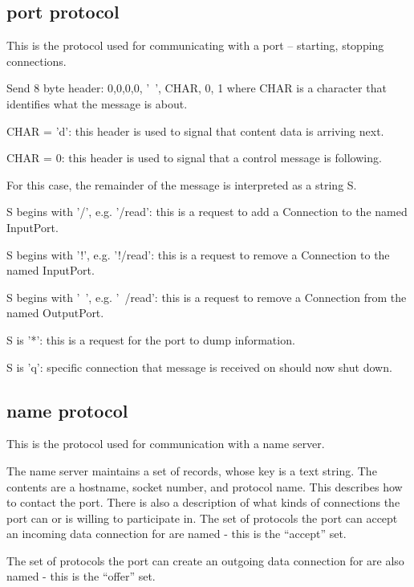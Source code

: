 \documentclass[a4]{article}
\begin{document}
\subsection{port protocol}

This is the protocol used for communicating with a port -- 
starting, stopping connections.

\begin{code}
Send 8 byte header: 0,0,0,0, '~', CHAR, 0, 1
where CHAR is a character that identifies what the message is about.

CHAR = 'd': this header is used to signal that content data is arriving next.

CHAR = 0: this header is used to signal that a control message is following.

  For this case, the remainder of the message is interpreted as a string S.

   S begins with '/', e.g. '/read': this is a request to add a Connection 
   to the named InputPort.

   S begins with '!', e.g. '!/read': this is a request to remove a Connection 
   to the named InputPort.

   S begins with '~', e.g. '~/read': this is a request to remove a Connection 
   from the named OutputPort.

   S is '*': this is a request for the port to dump information.

   S is 'q': specific connection that message is received on should 
   now shut down.

\end{code}



\subsection{name protocol}

This is the protocol used for communication with a name server.

The name server maintains a set of records, whose key is a text
string.  The contents are a hostname, socket number, and protocol
name.  This describes how to contact the port.  There is also
a description of what kinds of connections the port can or is
willing to participate in.  The set of protocols the port can
accept an incoming data connection for are named - this is the 
``accept'' set.

The set of protocols the port can create an outgoing data 
connection for are also named - this is the ``offer'' set.
\end{document}
